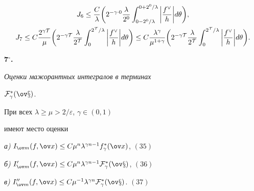\begin{gather} 


J_6\le\frac{C}{\lambda}\bigg(2^{-\gamma\cdot 0} 


\frac{\lambda}{2^0} 


\int^{0+2^0/\lambda}_{0-2^0/\lambda} 


\bigg|\frac{f^\vee}{h}\bigg|d\theta\bigg),\\ 


% 


J_7\le C\frac{2^{\gamma\cal T}}{\mu}\bigg( 


2^{-\gamma\cal T}\frac{\lambda}{2^{\cal T}} 


\int^{2^{\cal T}/\lambda}_0


\bigg|\frac{f^\vee}{h}\bigg|d\theta\bigg)\le C 


\frac{\lambda^\gamma}{\mu^{1+\gamma}}\bigg( 


2^{-\gamma\cal T}\frac{\lambda}{2^{\cal T}} 


\int^{2^{\cal T}/\lambda}_0


\bigg|\frac{f^\vee}{h}\bigg|d\theta\bigg). 


\end{gather} 


 


{\bf 7${}^\circ$.} {\it Оценки мажорантных интегралов в терминах 


$\cal F^*_\gamma(\ov x)$.} 


 


\begin{lem} При всех $\lambda\ge\mu>2/\varepsilon$, $\gamma\in(0,1)$ 


имеют место оценки 


\smallskip 


 


{\em а)} $I_{\ov m}(f,\ov x)\le C\mu^n\lambda^{\gamma n-1} 


f^*_\gamma(\ov x)$, \hfill $(35)$


\smallskip 


 


{\em б)} $I'_{\ov m}(f,\ov x)\le C\mu^n\lambda^{\gamma n-1} 


\cal F^*_\gamma(\ov x)$, \hfill $(36)$


\smallskip 


 


{\em в)} $I''_{\ov m}(f,\ov x)\le C\mu^{-1}\lambda^{\gamma n} 


\cal F^*_\gamma(\ov x)$. \hspace{104mm} $(37)$


\end{lem} 


